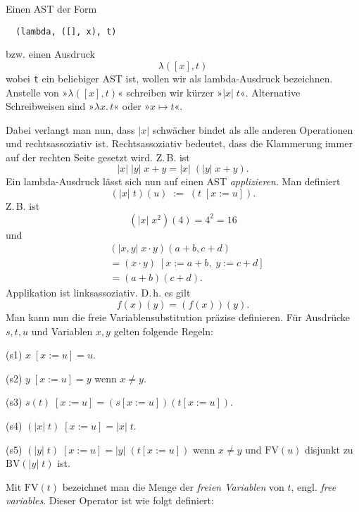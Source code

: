 \documentclass[a4paper,11pt,fleqn,twocolumn,twoside]{article}
\numberwithin{equation}{section}
\begin{document}
Einen AST der Form
\begin{verbatim}
  (lambda, ([], x), t)
\end{verbatim}
bzw. einen Ausdruck
\begin{equation}
\lambda([x],t)
\end{equation}
wobei \texttt{t} ein beliebiger AST ist,
wollen wir als lambda-Ausdruck bezeichnen. Anstelle von
»$\lambda([x],t)$« schreiben wir kürzer »$|x|\;t$«. Alternative
Schreibweisen sind »$\lambda x.\,t$« oder »$x\mapsto t$«.

Dabei verlangt man nun, dass $|x|$ schwächer bindet als alle anderen
Operationen und rechtsassoziativ ist. Rechtsassoziativ bedeutet, dass
die Klammerung immer auf der rechten Seite gesetzt wird. Z.\,B. ist
\begin{equation}
|x|\;|y|\; x+y = |x|\;(|y|\;x+y).
\end{equation}
Ein lambda-Ausdruck lässt sich nun auf einen AST \emph{applizieren}.
Man definiert
\begin{equation}
(|x|\; t)(u) \;:=\; (t\;[x:=u]).
\end{equation}
Z.\,B. ist
\begin{equation}
(|x|\;x^2)(4) = 4^2 = 16
\end{equation}
und
\begin{equation}
\begin{split}
& (|x,y|\;x\cdot y)(a+b,c+d)\\
&= (x\cdot y)\;[x:=a+b,\;y:=c+d]\\
&= (a+b)(c+d).
\end{split}
\end{equation}
Applikation ist linksassoziativ. D.\,h. es gilt
\begin{equation}
f(x)(y) = (f(x))(y).
\end{equation}
Man kann nun die freie Variablensubstitution präzise definieren.
Für Ausdrücke $s,t,u$ und Variablen $x,y$ gelten folgende Regeln:

(s1) $x\;[x:=u] = u$.

(s2) $y\;[x:=u] = y$ wenn $x\ne y$.

(s3) $s(t)\;[x:=u] = (s[x:=u])(t[x:=u])$.

(s4) $(|x|\;t)\;[x:=u] = |x|\;t$.

(s5) $(|y|\;t)\;[x:=u] = |y|\;(t[x:=u])$ wenn $x\ne y$
und $\mathrm{FV}(u)$ disjunkt zu $\mathrm{BV}(|y|\;t)$ ist.

Mit $\mathrm{FV}(t)$ bezeichnet man die Menge der \emph{freien Variablen}
von $t$, engl. \emph{free variables}. Dieser Operator ist wie folgt
definiert:
\end{document}
